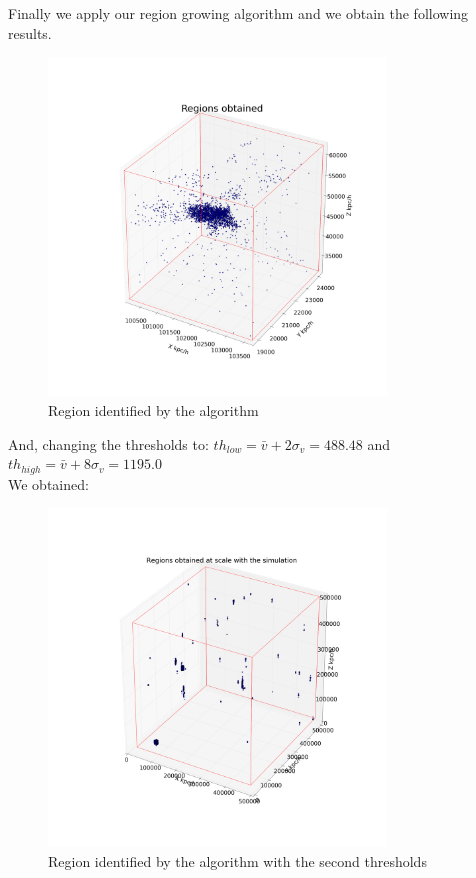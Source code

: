 \documentclass[12pt]{article}
\begin{document}
Finally we apply our region growing algorithm and we obtain the following results.\\

\begin{figure}[ht]
\begin{center}
\includegraphics[width=0.8\textwidth]{graphs/regions_small.png} %
\caption{Region identified by the algorithm}
\label{fg:regions_small}
\end{center}
\end{figure}
\FloatBarrier

And, changing the thresholds to: 
$th_{low} = \bar{v} + 2  \sigma_{v} = 488.48$ and $th_{high} = \bar{v}  +  8 \sigma_{v} =1195.0 $\\
We obtained:
\begin{figure}[ht]
\begin{center}
\includegraphics[width=0.8\textwidth]{graphs/regions_big.png} %
\caption{Region identified by the algorithm with the second thresholds}
\label{fg:regions_small}
\end{center}
\end{figure}
\FloatBarrier
\end{document}
